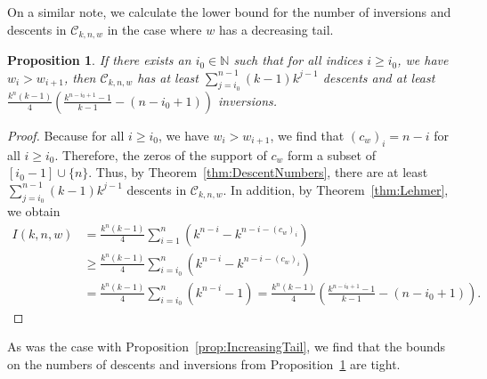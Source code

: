 \documentclass[final]{dmtcs-episciences}
\newtheorem{proposition}[theorem]{Proposition}
\theoremstyle{definition}
\theoremstyle{remark}
\begin{document}
On a similar note, we calculate the lower bound for the number of inversions and descents in $\mathcal{C}_{k, n, w}$ in the case where $w$ has a decreasing tail.
\begin{proposition}\label{prop:DecreasingTail}
    If there exists an $i_0 \in \mathbb{N}$ such that for all indices $i\geq i_0$, we have $w_i > w_{i+1}$, then $\mathcal{C}_{k, n, w}$ has at least $\sum_{j=i_0}^{n-1}(k-1)k^{j-1}$ descents and at least $\frac{k^n(k-1)}{4}\left(\frac{k^{n-i_0+1}-1}{k-1} - (n - i_0 + 1)\right)$ inversions.
\end{proposition}
\begin{proof}
    Because for all $i \geq i_0$, we have $w_i > w_{i+1}$, we find that $(c_{w})_i =  n-i$ for all $i \geq i_0$. Therefore, the zeros of the support of $c_w$ form a subset of $[i_0-1] \cup \{n\}$. Thus, by Theorem~\ref{thm:DescentNumbers}, there are at least $\sum_{j=i_0}^{n-1}(k-1)k^{j-1}$ descents in $\mathcal{C}_{k, n, w}$. In addition, by Theorem~\ref{thm:Lehmer}, we obtain
    \begin{equation*}\begin{split}
        I(k, n, w) & = \frac{k^n(k-1)}{4}\sum_{i=1}^n (k^{n-i} - k^{n-i-(c_w)_i}) \\  & \geq \frac{k^n(k-1)}{4}\sum_{i=i_0}^n (k^{n-i} - k^{n-i-(c_w)_i})  \\&  = \frac{k^n(k-1)}{4}\sum_{i=i_0}^n (k^{n-i} - 1)  = \frac{k^n(k-1)}{4}\left(\frac{k^{n-i_0+1}-1}{k-1} - (n - i_0 + 1)\right). \end{split}
    \end{equation*}\end{proof}

As was the case with Proposition~\ref{prop:IncreasingTail}, we find that the bounds on the numbers of descents and inversions from Proposition~\ref{prop:DecreasingTail} are tight.
\end{document}
